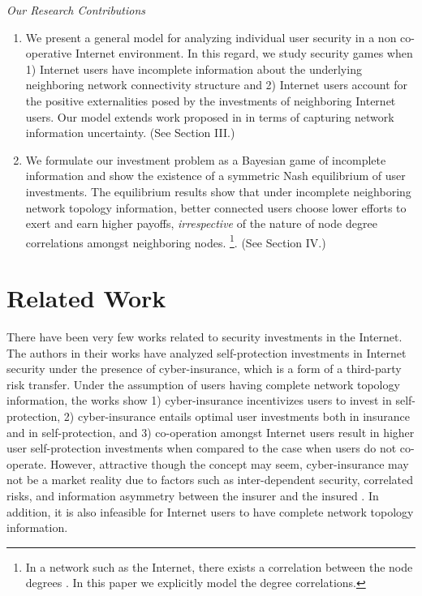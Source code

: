 \documentclass[letterpaper,12pt,onecolumn, nodraft]{IEEEtran}
\begin{document}
\emph{Our Research Contributions}
\begin{enumerate}
\item We present a general model for analyzing individual user security in a non co-operative Internet environment.  In this regard, we study security games when 1) Internet users have incomplete information about the underlying neighboring network connectivity structure and 2) Internet users account for the positive externalities posed by the investments of neighboring Internet users. Our model extends work proposed in \cite{gccr1}\cite{gccr}  in terms of capturing network information uncertainty. (See Section III.) \\
\item We formulate our investment problem as a Bayesian game of incomplete information and show the existence of a symmetric Nash equilibrium of user investments. The equilibrium results show that under incomplete neighboring network topology information, better connected users choose lower efforts to exert and earn higher payoffs, \emph{irrespective} of the nature of node degree correlations amongst neighboring nodes. \footnote{In a network such as the Internet, there exists a correlation between the node degrees \cite{newman2}. In this paper we explicitly model the degree correlations.}. (See Section IV.)  
\end{enumerate}
 
\section{Related Work}  \label{related-work} 
There have been very few works related to security investments in the Internet. The authors \cite{leb}\cite{pg} in their works have analyzed self-protection investments in Internet security under the presence of cyber-insurance, which is a form of a third-party risk transfer. Under the assumption of users having complete network topology information, the works show 1) cyber-insurance incentivizes users to invest in self-protection, 2) cyber-insurance entails optimal user investments both in insurance and in self-protection, and 3) co-operation amongst Internet users result in higher user self-protection investments when compared to the case when users do not co-operate. However, attractive though the concept may seem, cyber-insurance may not be a market reality due to factors such as inter-dependent security, correlated risks, and information asymmetry between the insurer and the insured \cite{rabohme}\cite{ssfw}. In addition, it is also infeasible for Internet users to have complete network topology information.
\end{document}

